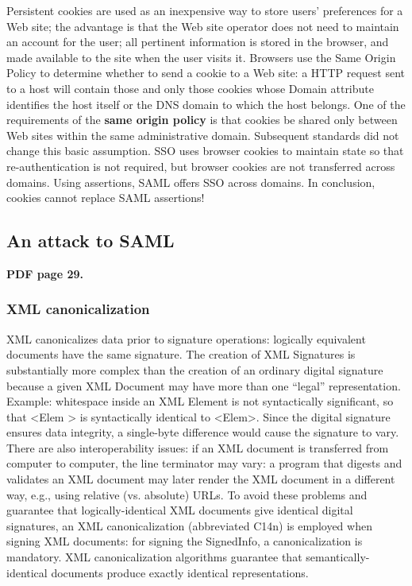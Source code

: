 \documentclass[a4paper, 10pt, titlepage]{article}
\begin{document}
Persistent cookies are used as an inexpensive way to store users’ preferences for a Web site; the advantage is that the Web site operator does not need to maintain an account for the user; all pertinent information is stored in the browser, and made available to the site when the user visits it. Browsers use the Same Origin Policy to determine whether to send a cookie to a Web site: a HTTP request sent to a host will contain those and only those cookies whose Domain attribute identifies the host itself or the DNS domain to which the host belongs. One of the requirements of the \textbf{same origin policy} is that cookies be shared only between Web sites within the same administrative domain. Subsequent standards did not change this basic assumption. SSO uses browser cookies to maintain state so that re-authentication is not required, but browser cookies are not transferred across domains. Using assertions, SAML offers SSO across domains. In conclusion, cookies cannot replace SAML assertions!

\subsection{An attack to SAML}
\textbf{PDF page 29.}

\subsubsection{XML canonicalization}
XML canonicalizes data prior to signature operations: logically equivalent documents have the same signature. The creation of XML Signatures is substantially more complex than the creation of an ordinary digital signature because a given XML Document may have more than one “legal” representation. Example: whitespace inside an XML Element is not syntactically significant, so that <Elem > is syntactically identical to <Elem>. Since the digital signature ensures data integrity, a single-byte difference would cause the
signature to vary. 
There are also interoperability issues: if an XML document is transferred from computer to computer, the line terminator may vary: a program that digests and validates an XML document may later render the XML document in a different way, e.g., using relative (vs. absolute) URLs. To avoid these problems and guarantee that logically-identical XML documents give identical digital signatures, an XML canonicalization (abbreviated C14n) is employed when signing XML documents: for signing the SignedInfo, a canonicalization is mandatory. XML canonicalization algorithms guarantee that semantically-identical documents produce exactly identical representations.
\end{document}
